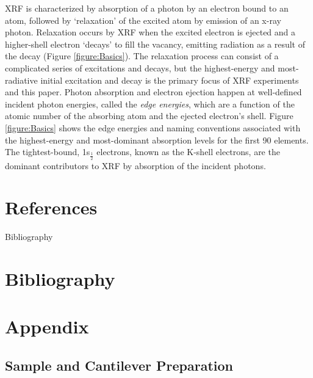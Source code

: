\documentclass[%
  aip,12pt,tightenlines,
  amsthm,
 amsmath,amssymb
]{article}
\newcommand{\fRef}[1]{Figure \ref{figure:#1}}
\newcommand{\firstp}[0]{}
\begin{document}
\firstp XRF is characterized by absorption of a photon by an electron bound to an atom, followed by `relaxation' of the excited atom by emission of an x-ray photon.\cite{jitschin_progress_1990} Relaxation occurs by XRF when the excited electron is ejected and a higher-shell electron `decays' to fill the vacancy, emitting radiation as a result of the decay (\fRef{Basics}). The relaxation process can consist of a complicated series of excitations and decays,\cite{santra_concepts_2009} but the highest-energy and most-radiative initial excitation and decay is the primary focus of XRF experiments and this paper. Photon absorption and electron ejection happen at well-defined incident photon energies, called the \emph{edge energies}, which are a function of the atomic number of the absorbing atom and the ejected electron's shell.\cite{ueda_high-resolution_2003,de_groot_high-resolution_2001} \fRef{Basics} shows the edge energies and naming conventions associated with the highest-energy and most-dominant\cite{chantler_detailed_2000} absorption levels for the first 90 elements. The tightest-bound, 1s$_{\frac{1}{2}}$ electrons, known as the K-shell electrons, are the dominant contributors to XRF by absorption of the incident photons.\cite{chantler_detailed_2000}

\clearpage

\section{References}



\clearpage

Bibliography 

\section{Bibliography}

 


\clearpage

\section{Appendix}

\subsection{Sample and Cantilever Preparation}
\end{document}
